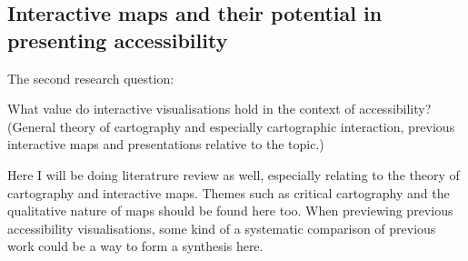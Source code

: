 

\subsection{Interactive maps and their potential in presenting accessibility}
The second research question:

\begin{displayquote}
What value do interactive visualisations hold in the context of accessibility?
(General theory of cartography and especially cartographic interaction,
previous interactive maps and presentations relative to the topic.)
\end{displayquote}

Here I will be doing literatrure review as well,
especially relating to the theory of cartography and interactive maps.
Themes such as critical cartography
and the qualitative nature of maps should be found here too.
When previewing previous accessibility visualisations,
some kind of a systematic comparison of previous work
could be a way to form a synthesis here.
